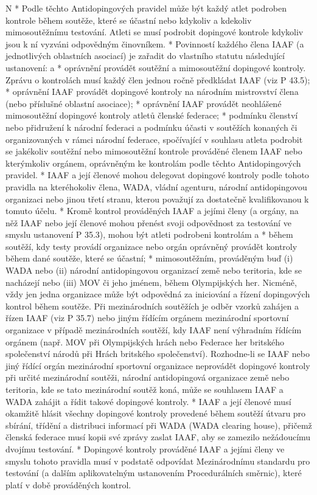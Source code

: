 \begitems \style N
* Podle těchto Antidopingových pravidel může být každý atlet podroben kontrole během soutěže, které se účastní nebo kdykoliv a kdekoliv mimosoutěžnímu testování. Atleti se musí podrobit dopingové kontrole kdykoliv jsou k ní vyzváni odpovědným činovníkem.
* Povinností každého člena IAAF (a jednotlivých oblastních asociací) je zařadit do vlastního statutu následující ustanovení:
  \begitems \style a
  * oprávnění provádět soutěžní a mimosoutěžní dopingové kontroly. Zprávu o kontrolách musí každý člen jednou ročně předkládat IAAF (viz P 43.5);
  * oprávnění IAAF provádět dopingové kontroly na národním mistrovství člena (nebo příslušné oblastní asociace);
  * oprávnění IAAF provádět neohlášené mimosoutěžní dopingové kontroly atletů členské federace;
  * podmínku členství nebo přidružení k národní federaci a podmínku účasti v soutěžích konaných či organizovaných v rámci národní federace, spočívající v souhlasu atleta podrobit se jakékoliv soutěžní nebo mimosoutěžní kontrole prováděné členem IAAF nebo kterýmkoliv orgánem, oprávněným ke kontrolám podle těchto Antidopingových pravidel.
  \enditems
* IAAF a její členové mohou delegovat dopingové kontroly podle tohoto pravidla na kteréhokoliv člena, WADA, vládní agenturu, národní antidopingovou organizaci nebo jinou třetí stranu, kterou považují za dostatečně kvalifikovanou k tomuto účelu.
* Kromě kontrol prováděných IAAF a jejími členy (a orgány, na něž IAAF nebo její členové mohou přenést svoji odpovědnost za testování ve smyslu ustanovení P 35.3), mohou být atleti podrobeni kontrolám
  \begitems \style a
  * během soutěží, kdy testy provádí organizace nebo orgán oprávněný provádět kontroly během dané soutěže, které se účastní;
  * mimosoutěžním, prováděným buď (i) WADA nebo (ii) národní antidopingovou organizací země nebo teritoria, kde se nacházejí nebo (iii) MOV či jeho jménem, během Olympijských her.
  \enditems
Nicméně, vždy jen jedna organizace může být odpovědná za iniciování a řízení dopingových kontrol během soutěže. Při mezinárodních soutěžích je odběr vzorků zahájen a řízen IAAF (viz P 35.7) nebo jiným řídícím orgánem mezinárodní sportovní organizace v případě mezinárodních soutěží, kdy IAAF není výhradním řídícím orgánem (např. MOV při Olympijských hrách nebo Federace her britského společenství národů při Hrách britského společenství). Rozhodne-li se IAAF nebo jiný řídící orgán mezinárodní sportovní organizace neprovádět dopingové kontroly při určité mezinárodní soutěži, národní antidopingová organizace země nebo teritoria, kde se tato mezinárodní soutěž koná, může se souhlasem IAAF a WADA zahájit a řídit takové dopingové kontroly.
* IAAF a její členové musí okamžitě hlásit všechny dopingové kontroly provedené během soutěží útvaru pro sbírání, třídění a distribuci informací při WADA (WADA clearing house), přičemž členská federace musí kopii své zprávy zaslat IAAF, aby se zamezilo nežádoucímu dvojímu testování.
* Dopingové kontroly prováděné IAAF a jejími členy ve smyslu tohoto pravidla musí v podstatě odpovídat Mezinárodnímu standardu pro testování (a dalším aplikovatelným ustanovením Procedurálních směrnic), které platí v době prováděných kontrol.


